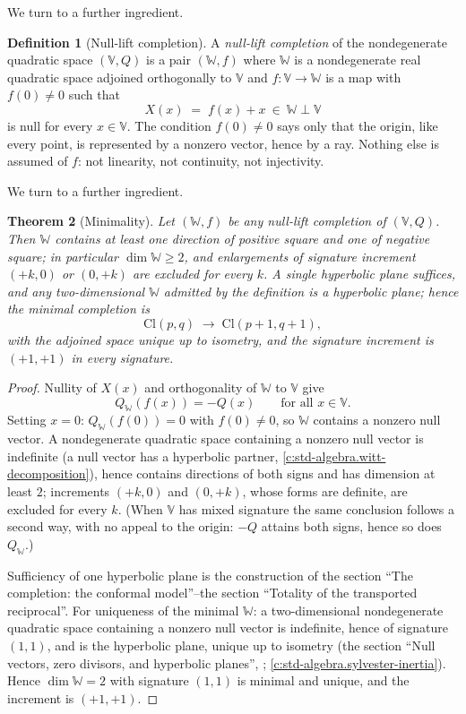 \documentclass[11pt]{article}
\newtheorem{theorem}{Theorem}[section]
\theoremstyle{definition}
\newtheorem{definition}[theorem]{Definition}
\theoremstyle{plain}
\providecommand{\Cl}{}\renewcommand{\Cl}{\mathrm{Cl}}
\begin{document}
We turn to a further ingredient.

\begin{definition}[Null-lift completion]\label{c:obj.transport.null-lift-completion}
A \emph{null-lift completion} of the nondegenerate quadratic space $(\mathbb{V}, Q)$ is a pair $(\mathbb{W}, f)$ where $\mathbb{W}$ is a nondegenerate real quadratic space adjoined orthogonally to $\mathbb{V}$ and $f : \mathbb{V} \to \mathbb{W}$ is a map with $f(0) \neq 0$ such that
\[
X(x) \;=\; f(x) + x \ \in\ \mathbb{W} \perp \mathbb{V}
\]
is null for every $x \in \mathbb{V}$. The condition $f(0) \neq 0$ says only that the origin, like every point, is represented by a nonzero vector, hence by a ray. Nothing else is assumed of $f$: not linearity, not continuity, not injectivity.
\end{definition}

We turn to a further ingredient.

\begin{theorem}[Minimality]\label{c:transport.minimality}
Let $(\mathbb{W}, f)$ be any null-lift completion of $(\mathbb{V}, Q)$. Then $\mathbb{W}$ contains at least one direction of positive square and one of negative square; in particular $\dim \mathbb{W} \geq 2$, and enlargements of signature increment $(+k, 0)$ or $(0, +k)$ are excluded for every $k$. A single hyperbolic plane suffices, and any two-dimensional $\mathbb{W}$ admitted by the definition is a hyperbolic plane; hence the minimal completion is
\[
\Cl(p,q) \;\longrightarrow\; \Cl(p{+}1, q{+}1),
\]
with the adjoined space unique up to isometry, and the signature increment is $(+1,+1)$ in every signature.
\end{theorem}
\begin{proof}
Nullity of $X(x)$ and orthogonality of $\mathbb{W}$ to $\mathbb{V}$ give
\[
Q_{\mathbb{W}}(f(x)) = -Q(x) \qquad \text{for all } x \in \mathbb{V}.
\]
Setting $x = 0$: $Q_{\mathbb{W}}(f(0)) = 0$ with $f(0) \neq 0$, so $\mathbb{W}$ contains a nonzero null vector. A nondegenerate quadratic space containing a nonzero null vector is indefinite \cite{Lam2005} (a null vector has a hyperbolic partner, \ref{c:std-algebra.witt-decomposition}), hence contains directions of both signs and has dimension at least $2$; increments $(+k,0)$ and $(0,+k)$, whose forms are definite, are excluded for every $k$. (When $\mathbb{V}$ has mixed signature the same conclusion follows a second way, with no appeal to the origin: $-Q$ attains both signs, hence so does $Q_{\mathbb{W}}$.)

Sufficiency of one hyperbolic plane is the construction of the section ``The completion: the conformal model''--the section ``Totality of the transported reciprocal''. For uniqueness of the minimal $\mathbb{W}$: a two-dimensional nondegenerate quadratic space containing a nonzero null vector is indefinite, hence of signature $(1,1)$, and is the hyperbolic plane, unique up to isometry (the section ``Null vectors, zero divisors, and hyperbolic planes'', \cite{Lam2005}; \ref{c:std-algebra.sylvester-inertia}). Hence $\dim \mathbb{W} = 2$ with signature $(1,1)$ is minimal and unique, and the increment is $(+1,+1)$.

\end{proof}
\end{document}
